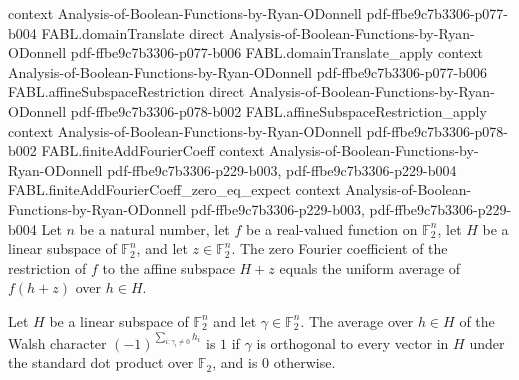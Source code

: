 \begin{theorem}
  {context}
  {Analysis-of-Boolean-Functions-by-Ryan-ODonnell}
  {pdf-ffbe9c7b3306-p077-b004}
\proofstep
  {FABL.domainTranslate}
  {direct}
  {Analysis-of-Boolean-Functions-by-Ryan-ODonnell}
  {pdf-ffbe9c7b3306-p077-b006}
\proofstep
  {FABL.domainTranslate_apply}
  {context}
  {Analysis-of-Boolean-Functions-by-Ryan-ODonnell}
  {pdf-ffbe9c7b3306-p077-b006}
\proofstep
  {FABL.affineSubspaceRestriction}
  {direct}
  {Analysis-of-Boolean-Functions-by-Ryan-ODonnell}
  {pdf-ffbe9c7b3306-p078-b002}
\proofstep
  {FABL.affineSubspaceRestriction_apply}
  {context}
  {Analysis-of-Boolean-Functions-by-Ryan-ODonnell}
  {pdf-ffbe9c7b3306-p078-b002}
\proofstep
  {FABL.finiteAddFourierCoeff}
  {context}
  {Analysis-of-Boolean-Functions-by-Ryan-ODonnell}
  {pdf-ffbe9c7b3306-p229-b003,
    pdf-ffbe9c7b3306-p229-b004}
\proofstep
  {FABL.finiteAddFourierCoeff_zero_eq_expect}
  {context}
  {Analysis-of-Boolean-Functions-by-Ryan-ODonnell}
  {pdf-ffbe9c7b3306-p229-b003,
    pdf-ffbe9c7b3306-p229-b004}
Let $n$ be a natural number, let $f$ be a real-valued function on $\mathbb{F}_2^n$, let
$H$ be a linear subspace of $\mathbb{F}_2^n$, and let $z\in\mathbb{F}_2^n$. The zero
Fourier coefficient of the restriction of $f$ to the affine subspace $H+z$ equals the
uniform average of $f(h+z)$ over $h\in H$.
\end{theorem}

\begin{theorem}
\label{FABL.expect_vectorWalshCharacter_submodule}
\leanok
{}
Let $H$ be a linear subspace of $\mathbb{F}_2^n$ and let $\gamma\in\mathbb{F}_2^n$.
The average over $h\in H$ of the Walsh character $(-1)^{\sum_{i:\gamma_i\ne 0}h_i}$ is
$1$ if $\gamma$ is orthogonal to every vector in $H$ under the standard dot product over
$\mathbb{F}_2$, and is $0$ otherwise.
\end{theorem}

